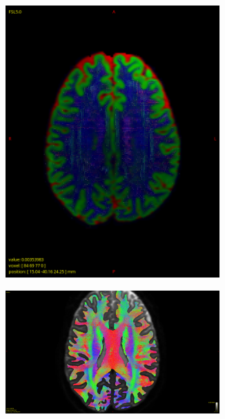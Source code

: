 \documentclass[msthesis.tex]{subfiles}
\begin{document}
\begin{figure}
\begin{subfigure}[b]{0.4\textwidth}
         \includegraphics[height=0.9\textwidth,width=0.9\textwidth]{images/tissueRGB0003.png}
         \caption{}
         \label{fig:1M_tract}
     \end{subfigure}
     \vfill
        \begin{subfigure}[b]{0.4\textwidth}
         \centering
       
         \includegraphics[height=0.9\textwidth,width=0.9\textwidth]{images/tractography_!M.png}
         \caption{}
         \label{fig:1M_tract}
     \end{subfigure}
    \hfill
         \begin{subfigure}[b]{0.4\textwidth}
         \centering
        

\end{subfigure}
\end{figure}
\end{document}

